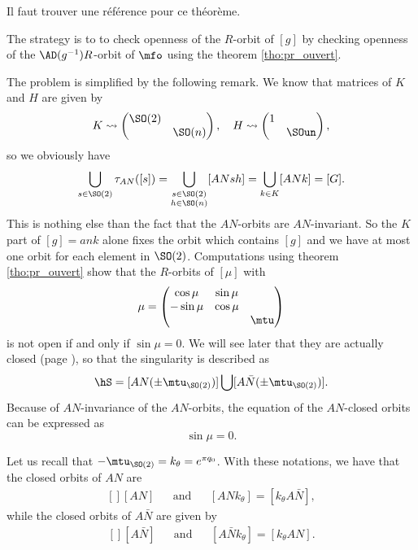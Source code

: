 \begin{probleme}
Il faut trouver une référence pour ce théorème.
\end{probleme}

The strategy is to to check openness of the $R$-orbit of $[g]$ by checking openness of the $\AD(g^{-1})R$-orbit of $\mfo$ using the theorem \ref{tho:pr_ouvert}.

The problem is simplified by the following remark.  We know that matrices of $K$ and $H$ are given by
\begin{equation}	\label{eq:K_H_SO}
  K\leadsto \begin{pmatrix}
                \SO(2)&   \\
		      & \SO(n)
            \end{pmatrix},\quad
  H\leadsto \begin{pmatrix}
                    1 & \\
		     & \SOun
            \end{pmatrix},
\end{equation}
so we obviously have
\[
\bigcup_{s\in \SO(2)} \tau_{AN}([s]) =\bigcup_{\substack { s\in \SO(2)\\ h\in \SO(n)}}[ANsh] =\bigcup_{k\in K} [ANk] =[G].
\]
This is nothing else than the fact that the $AN$-orbits are $AN$-invariant.
So the $K$ part of $[g]=ank$ alone fixes the orbit which contains $[g]$ and we have at most one orbit for each element in $\SO(2)$. Computations using theorem \ref{tho:pr_ouvert} show that the $R$-orbits of $[\mu]$ with
\[
\mu=
\begin{pmatrix}
\cos\mu &\sin\mu\\
-\sin\mu&\cos\mu\\
&&\mtu
\end{pmatrix}
\]
is not open if and only if $\sin \mu=0$. We will see later that they are actually closed (page \pageref{PgTopoOrb}), so that the singularity is described as
\begin{equation}\label{Sing2}
\hS=[AN(\pm\mtu_{\SO(2)})]\bigcup[A \bar{N}(\pm\mtu_{\SO(2)})].
\end{equation}
 Because of $AN$-invariance of the $AN$-orbits, the equation of the $AN$-closed orbits can be expressed as
\begin{equation}
\sin \mu=0.
\end{equation}

Let us recall that $-\mtu_{\SO(2)}=k_{\theta}= e^{\pi q_0}$. With these notations, we have that the closed orbits of $AN$ are
\begin{equation}
	\begin{aligned}[]
		[AN]&&\text{and}&&[ANk_{\theta}]=[k_{\theta}A\bar N],
	\end{aligned}
\end{equation}
while the closed orbits of $A\bar N$ are given by
\begin{equation}
	\begin{aligned}[]
		[A\bar N]&&\text{and}&&[A\bar Nk_{\theta}]=[k_{\theta}AN].
	\end{aligned}
\end{equation}

